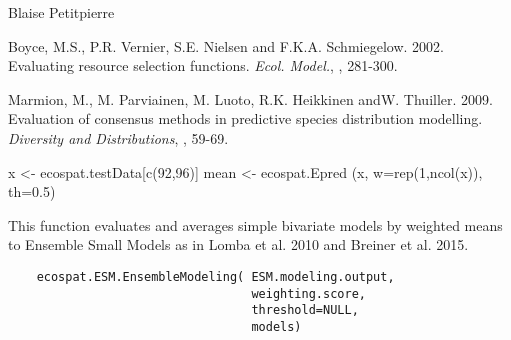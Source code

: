 \documentclass[a4paper]{book}
\begin{document}
%
\begin{Author}\relax
Blaise Petitpierre 
\end{Author}
%
\begin{References}\relax

Boyce, M.S.,  P.R. Vernier, S.E. Nielsen and  F.K.A. Schmiegelow. 2002. Evaluating resource selection functions. \emph{Ecol. Model.}, , 281-300.

Marmion, M., M. Parviainen, M. Luoto, R.K. Heikkinen andW.  Thuiller. 2009. Evaluation of consensus methods in predictive species distribution modelling.  \emph{Diversity and Distributions}, , 59-69.

\end{References}
%
\begin{Examples}
\begin{ExampleCode}
x <- ecospat.testData[c(92,96)]
mean <- ecospat.Epred (x, w=rep(1,ncol(x)), th=0.5)
\end{ExampleCode}
\end{Examples}
%
\begin{Description}\relax
This function evaluates and averages simple bivariate models by weighted means to Ensemble Small Models as in Lomba et al. 2010 and Breiner et al. 2015.

\end{Description}
%
\begin{Usage}
\begin{verbatim}
    ecospat.ESM.EnsembleModeling( ESM.modeling.output, 
                                  weighting.score, 
                                  threshold=NULL, 
                                  models)
\end{verbatim}
\end{Usage}
%
\end{document}
